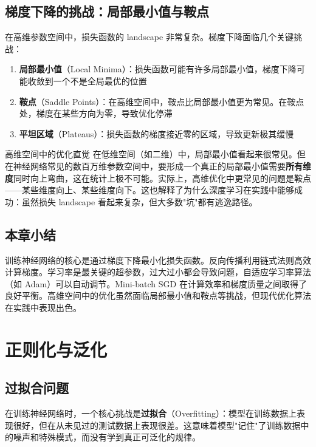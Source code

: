 \documentclass[a4paper]{article}
\begin{document}
\subsection{梯度下降的挑战：局部最小值与鞍点}

在高维参数空间中，损失函数的 landscape 非常复杂。梯度下降面临几个关键挑战：

\begin{enumerate}
\item \textbf{局部最小值}（Local Minima）：损失函数可能有许多局部最小值，梯度下降可能收敛到一个不是全局最优的位置
\item \textbf{鞍点}（Saddle Points）：在高维空间中，鞍点比局部最小值更为常见。在鞍点处，梯度在某些方向为零，导致优化停滞
\item \textbf{平坦区域}（Plateaus）：损失函数的梯度接近零的区域，导致更新极其缓慢
\end{enumerate}

\begin{knowledgebox}{高维空间中的优化直觉}
在低维空间（如二维）中，局部最小值看起来很常见。但在神经网络常见的数百万维参数空间中，要形成一个真正的局部最小值需要\textbf{所有维度}同时向上弯曲，这在统计上极不可能。实际上，高维优化中更常见的问题是鞍点——某些维度向上、某些维度向下。这也解释了为什么深度学习在实践中能够成功：虽然损失 landscape 看起来复杂，但大多数"坑"都有逃逸路径。
\end{knowledgebox}

\subsection{本章小结}

训练神经网络的核心是通过梯度下降最小化损失函数。反向传播利用链式法则高效计算梯度。学习率是最关键的超参数，过大过小都会导致问题，自适应学习率算法（如 Adam）可以自动调节。Mini-batch SGD 在计算效率和梯度质量之间取得了良好平衡。高维空间中的优化虽然面临局部最小值和鞍点等挑战，但现代优化算法在实践中表现出色。

\section{正则化与泛化}

\subsection{过拟合问题}

在训练神经网络时，一个核心挑战是\textbf{过拟合}（Overfitting）：模型在训练数据上表现很好，但在从未见过的测试数据上表现很差。这意味着模型"记住"了训练数据中的噪声和特殊模式，而没有学到真正可泛化的规律。
\end{document}
